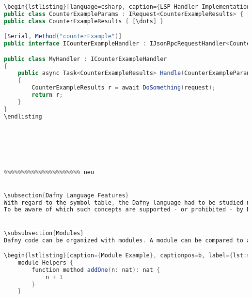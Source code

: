 \begin{lstlisting}[language=csharp, caption={LSP Handler Implementation}, captionpos=b, label={lst:lsphandler}]
\begin{lstlisting}[language=csharp, caption={LSP Handler Implementation}, captionpos=b, label={lst:lsphandler}]
public class CounterExampleParams : IRequest<CounterExampleResults> { [\dots] }
public class CounterExampleResults { [\dots] }

[Serial, Method("counterExample")]
public interface ICounterExampleHandler : IJsonRpcRequestHandler<CounterExampleParams, CounterExampleResults> { }

public class MyHandler : ICounterExampleHandler
{
    public async Task<CounterExampleResults> Handle(CounterExampleParams request, CancellationToken c)
    {
        CounterExampleResults r = await DoSomething(request);
        return r;
    }
}
\endlisting






%%%%%%%%%%%%%%%%%%%%%% neu


\subsection{Dafny Language Features}
With regard to the symbol table, the Dafny language had to be studied more in detail. For example, overloading describes the existence of multiple methods with the same name, but different signatures. This is obviously highly relevant for the construction of a symbol table.
To be aware of which such concepts are supported - or prohibited - by Dafny, we studied the Dafny Reference Guide \cite{dafnyReferenceManual}. This chapter provides the reader with the most relevant concepts in regard to the symbol table. Of cousre, Dafny offers much more language features.


\subsubsection{Modules}
Dafny code can be organized with modules. A module can be compared to a namespace in \Csharp or C++. Modules can also be nested. To use a class, method or variable defined in another module, the user has three options. Imagine a method \texttt{addOne} defined in a module \texttt{Helpers}.

\begin{lstlisting}[caption={Module Example}, captionpos=b, label={lst:shadowing}]
    module Helpers {
        function method addOne(n: nat): nat {
            n + 1
        }
    }
\end{lstlisting}

